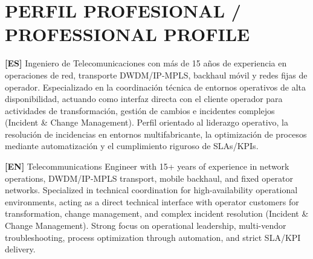 \section*{PERFIL PROFESIONAL / PROFESSIONAL PROFILE}

\textbf{[ES]} Ingeniero de Telecomunicaciones con más de 15 años de experiencia en operaciones de red, transporte DWDM/IP-MPLS, backhaul móvil y redes fijas de operador. Especializado en la coordinación técnica de entornos operativos de alta disponibilidad, actuando como interfaz directa con el cliente operador para actividades de transformación, gestión de cambios e incidentes complejos (Incident \& Change Management). Perfil orientado al liderazgo operativo, la resolución de incidencias en entornos multifabricante, la optimización de procesos mediante automatización y el cumplimiento riguroso de SLAs/KPIs.

\vspace{4pt}

\textbf{[EN]} Telecommunications Engineer with 15+ years of experience in network operations, DWDM/IP-MPLS transport, mobile backhaul, and fixed operator networks. Specialized in technical coordination for high-availability operational environments, acting as a direct technical interface with operator customers for transformation, change management, and complex incident resolution (Incident \& Change Management). Strong focus on operational leadership, multi-vendor troubleshooting, process optimization through automation, and strict SLA/KPI delivery.